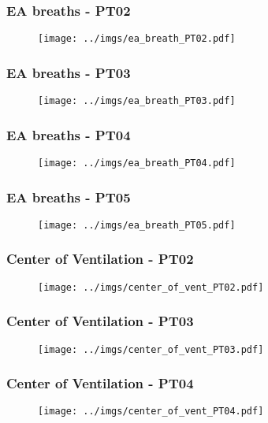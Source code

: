 \documentclass[10pt,    %
    english,            %
    xcolor=table,       %
    envcountsect,        %
    aspectratio=1610
]{beamer}
\begin{document}
\begin{frame}
 	\frametitle{EA breaths - PT02}    
		\begin{figure}[H]
			\centering
			\texttt{[image: ../imgs/ea\_breath\_PT02.pdf]}
		\end{figure}
 \end{frame}

\begin{frame}
 	\frametitle{EA breaths - PT03}    
		\begin{figure}[H]
			\centering
			\texttt{[image: ../imgs/ea\_breath\_PT03.pdf]}
		\end{figure}
 \end{frame}

\begin{frame}
 	\frametitle{EA breaths - PT04}    
		\begin{figure}[H]
			\centering
			\texttt{[image: ../imgs/ea\_breath\_PT04.pdf]}
		\end{figure}
 \end{frame}

\begin{frame}
 	\frametitle{EA breaths - PT05}    
		\begin{figure}[H]
			\centering
			\texttt{[image: ../imgs/ea\_breath\_PT05.pdf]}
		\end{figure}
 \end{frame}

\begin{frame}
 	\frametitle{Center of Ventilation - PT02}    
		\begin{figure}[H]
			\centering
			\texttt{[image: ../imgs/center\_of\_vent\_PT02.pdf]}
		\end{figure}
 \end{frame}

\begin{frame}
 	\frametitle{Center of Ventilation - PT03}    
		\begin{figure}[H]
			\centering
			\texttt{[image: ../imgs/center\_of\_vent\_PT03.pdf]}
		\end{figure}
 \end{frame}

\begin{frame}
 	\frametitle{Center of Ventilation - PT04}    
		\begin{figure}[H]
			\centering
			\texttt{[image: ../imgs/center\_of\_vent\_PT04.pdf]}
		\end{figure}
 \end{frame}
\end{document}
